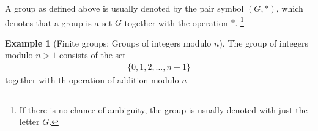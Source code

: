 \documentclass[nohyper,nobib]{tufte-handout}
\theoremstyle{definition}
\newtheorem{exmp}[thm]{Example}
\theoremstyle{remark}
\newtheorem{rem}[thm]{Remark}
\begin{document}
\noindent
A group as defined above is usually denoted by the pair symbol $(G,*)$, which denotes that a group is a set $G$ together with the operation $*$. \footnote{If there is no chance of ambiguity, the group is usually denoted with just the letter $G$.}



\begin{exmp}[Finite groups: Groups of integers modulo $n$]
    The group of integers modulo $n>1$ consists of the set
    \begin{align}
        \{0, 1, 2, \ldots, n - 1\}
    \end{align}
    together with th operation of addition modulo $n$
\end{exmp}

\begin{marginfigure}
    \def\svgwidth{\linewidth}
    \resizebox{0.8\textwidth}{!}{}
    \caption{}
\end{marginfigure}
\end{document}

